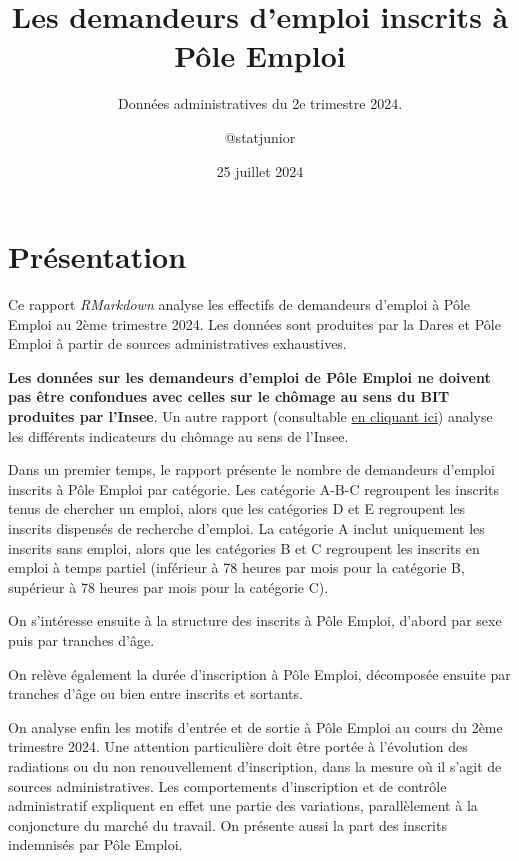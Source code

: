 \documentclass[
]{article}
\title{Les demandeurs d'emploi inscrits à Pôle Emploi}
\subtitle{Données administratives du 2e trimestre 2024.}
\author{@statjunior}
\date{25 juillet 2024}
\begin{document}
\maketitle

\section{Présentation}\label{pruxe9sentation}

Ce rapport \emph{RMarkdown} analyse les effectifs de demandeurs d'emploi
à Pôle Emploi au 2ème trimestre 2024. Les données sont produites par la
Dares et Pôle Emploi à partir de sources administratives exhaustives.

\textbf{Les données sur les demandeurs d'emploi de Pôle Emploi ne
doivent pas être confondues avec celles sur le chômage au sens du BIT
produites par l'Insee}. Un autre rapport (consultable
\href{https://github.com/statjunior/Statjunior/tree/main/March\%C3\%A9\%20du\%20travail\%20et\%20ch\%C3\%B4mage/Ch\%C3\%B4mage\%20BIT\%2C\%20halo\%20et\%20sous\%20emploi\%20-\%20Enqu\%C3\%AAte\%20Emploi/}{en
cliquant ici}) analyse les différents indicateurs du chômage au sens de
l'Insee.

Dans un premier temps, le rapport présente le nombre de demandeurs
d'emploi inscrits à Pôle Emploi par catégorie. Les catégorie A-B-C
regroupent les inscrits tenus de chercher un emploi, alors que les
catégories D et E regroupent les inscrits dispensés de recherche
d'emploi. La catégorie A inclut uniquement les inscrits sans emploi,
alors que les catégories B et C regroupent les inscrits en emploi à
temps partiel (inférieur à 78 heures par mois pour la catégorie B,
supérieur à 78 heures par mois pour la catégorie C).

On s'intéresse ensuite à la structure des inscrits à Pôle Emploi,
d'abord par sexe puis par tranches d'âge.

On relève également la durée d'inscription à Pôle Emploi, décomposée
ensuite par tranches d'âge ou bien entre inscrits et sortants.

On analyse enfin les motifs d'entrée et de sortie à Pôle Emploi au cours
du 2ème trimestre 2024. Une attention particulière doit être portée à
l'évolution des radiations ou du non renouvellement d'inscription, dans
la mesure où il s'agit de sources administratives. Les comportements
d'inscription et de contrôle administratif expliquent en effet une
partie des variations, parallèlement à la conjoncture du marché du
travail. On présente aussi la part des inscrits indemnisés par Pôle
Emploi.
\end{document}
